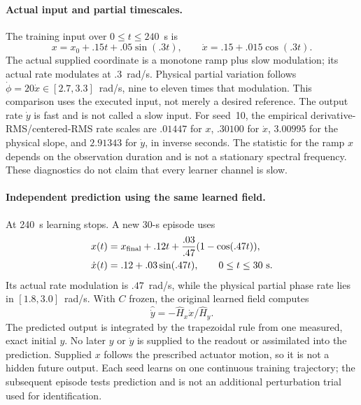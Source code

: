 \documentclass[journal]{IEEEtran}
\begin{document}
\paragraph{Actual input and partial timescales.}
The training input over $0\le t\le240$~s is
\begin{equation}
 x=x_0+.15t+.05\sin(.3t),\qquad
 \dot x=.15+.015\cos(.3t).
 \label{eq:df_train_input}
\end{equation}
The actual supplied coordinate is a monotone ramp plus slow modulation;
its actual rate modulates at $.3$~rad/s. Physical partial variation follows
$\dot\phi=20\dot x\in[2.7,3.3]$~rad/s, nine to eleven times that modulation.
This comparison uses the executed input, not merely a desired reference.
The output rate $\dot y$ is fast and is not called a slow input.
For seed~10, the empirical derivative-RMS/centered-RMS rate scales are
$.01447$ for $x$, $.30100$ for $\dot x$, $3.00995$ for the physical slope,
and $2.91343$ for $\dot y$, in inverse seconds. The statistic for the ramp
$x$ depends on the observation duration and is not a stationary spectral
frequency. These diagnostics do not claim that every learner channel is slow.

\paragraph{Independent prediction using the same learned field.}
At 240~s learning stops. A new 30-s episode uses
\begin{align}
 x(t)&=x_{\rm final}+.12t+\frac{.03}{.47}(1-\cos(.47t)),\\
 \dot x(t)&=.12+.03\sin(.47t),\qquad 0\le t\le30~\mathrm{s}.
 \label{eq:df_test_input}
\end{align}
Its actual rate modulation is $.47$~rad/s, while the physical partial phase
rate lies in $[1.8,3.0]$~rad/s. With $C$ frozen, the original learned field
computes
\begin{equation}
 \widehat{\dot y}=-\widehat H_x\dot x/\widehat H_y.
 \label{eq:df_readout}
\end{equation}
The predicted output is integrated by the trapezoidal rule from one measured,
exact initial $y$. No later $y$ or $\dot y$ is supplied to the readout or
assimilated into the prediction. Supplied $x$ follows the prescribed actuator
motion, so it is not a hidden future output. Each seed learns on one
continuous training trajectory; the subsequent episode tests prediction and
is not an additional perturbation trial used for identification.
\end{document}
